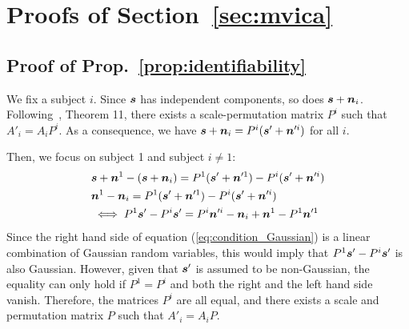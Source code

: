 \section{Proofs of Section~\ref{sec:mvica}}
\label{sec:app_proofs}
\subsection{Proof of Prop.~\ref{prop:identifiability}}
\label{app:proof:mvica:identifiability}
We fix a subject $i$. Since $\boldsymbol{s}$ has independent components, so does $\boldsymbol{s} + \boldsymbol{n}_i$. Following~\cite{comon1994independent},
Theorem 11, there exists a scale-permutation matrix $P^i$ such that $A'_i =
A_iP^i$. As a consequence, we have $\boldsymbol{s}  + \boldsymbol{n}_i = P^i(\boldsymbol{s}' + \boldsymbol{n}'^i)$ for all
$i$.

Then, we focus on subject 1 and subject $i \neq 1$:
\begin{align}
  &\boldsymbol{s} + \boldsymbol{n}^1 - (\boldsymbol{s} + \boldsymbol{n}_i) = P^1(\boldsymbol{s}' + \boldsymbol{n}'^1) - P^i(\boldsymbol{s}' + \boldsymbol{n}'^i)\\
  &\boldsymbol{n}^1 - \boldsymbol{n}_i = P^1(\boldsymbol{s}' + \boldsymbol{n}'^1) - P^i(\boldsymbol{s}' + \boldsymbol{n}'^i)\\
  &\iff P^1\boldsymbol{s}' - P^i\boldsymbol{s}' = P^i \boldsymbol{n}'^i - \boldsymbol{n}_i + \boldsymbol{n}^1 - P^1 \boldsymbol{n}'^1 \label{eq:condition_Gaussian}
\end{align}
Since the right hand side of equation (\ref{eq:condition_Gaussian}) is a linear combination of Gaussian random variables, this would imply that $P^1\boldsymbol{s}' - P^i\boldsymbol{s}'$ is also Gaussian. However, given that $\boldsymbol{s}'$ is assumed to be non-Gaussian, the equality can only hold if $P^1
= P^i$ and both the right and the left hand side vanish.
Therefore, the matrices $P^i$ are all equal, and there exists a scale and permutation matrix $P$ such that $A'_i = A_iP$.

